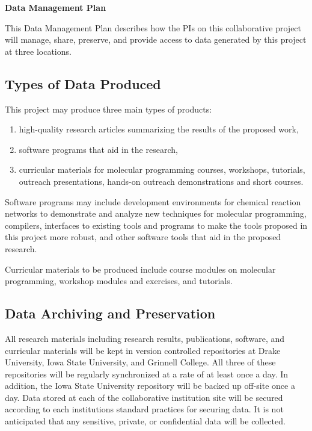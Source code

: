 \documentclass[11pt]{article}
\begin{document}
    \setcounter{page}{1}
    \begin{center}
        {\Large {\bf Data Management Plan}}
    \end{center}

    This Data Management Plan describes how the PIs on this collaborative project will manage, share, preserve, and provide access to data generated by this project at three locations.

    \subsection*{Types of Data Produced}
    This project may produce three main types of products:
    \begin{enumerate}
    \item high-quality research articles summarizing the results of the proposed work,
    \item software programs that aid in the research,
    \item curricular materials for molecular programming courses, workshops, tutorials, outreach presentations, hands-on outreach demonstrations and short courses.
    \end{enumerate}
        Software programs may include development environments for chemical reaction networks to demonstrate and analyze new techniques for molecular programming, compilers, interfaces to existing tools and programs to make the tools proposed in this project more robust, and other software tools that aid in the proposed research.
    
    Curricular materials to be produced include course modules on molecular programming, workshop modules and exercises, and tutorials.  
    
    \subsection*{Data Archiving and Preservation}
    All research materials including research results, publications, software, and curricular materials will be kept in version controlled repositories at Drake University, Iowa State University, and Grinnell College.
    All three of these repositories will be regularly synchronized at a rate of at least once a day.
    In addition,  the Iowa State University repository will be backed up off-site once a day.
    Data stored at each of the collaborative institution site will be secured according to each institutions standard practices for securing data.
    It is not anticipated that any sensitive, private, or confidential data will be collected.
    
\end{document}
